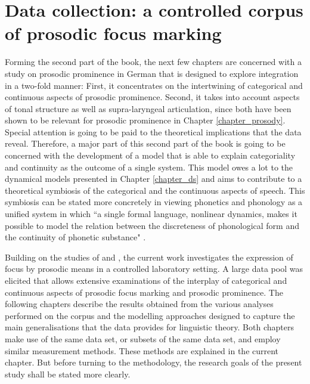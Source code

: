 \chapter{Data collection: a controlled corpus of prosodic focus marking}
\label{chapter_data}

Forming the second part of the book, the next few chapters are concerned with a study on prosodic prominence in German that is designed to explore integration in a two-fold manner: First, it concentrates on the intertwining of categorical and continuous aspects of prosodic prominence. Second, it takes into account aspects of tonal structure as well as supra-laryngeal articulation, since both have been shown to be relevant for prosodic prominence in Chapter \ref{chapter_prosody}. Special attention is going to be paid to the theoretical implications that the data reveal. Therefore, a major part of this second part of the book is going to be concerned with the development of a model that is able to explain categoriality and continuity as the outcome of a single system. This model owes a lot to the dynamical models presented in Chapter \ref{chapter_ds} and aims to contribute to a theoretical symbiosis of the categorical and the continuous aspects of speech. This symbiosis can be stated more concretely in viewing phonetics and phonology as a unified system in which ``a single formal language, nonlinear dynamics, makes it possible to model the relation between the discreteness of phonological form and the continuity of phonetic substance" \citep[937]{GafosBenus2006}. 

Building on the studies of \citet{MückeGrice2014} and \citet{Griceetal2017}, the current work investigates the expression of focus by prosodic means in a controlled laboratory setting. A large data pool was elicited that allows extensive examinations of the interplay of categorical and continuous aspects of prosodic focus marking and prosodic prominence. The following chapters describe the results obtained from the various analyses performed on the corpus and the modelling approaches designed to capture the main generalisations that the data provides for linguistic theory. Both chapters make use of the same data set, or subsets of the same data set, and employ similar measurement methods. These methods are explained in the current chapter. But before turning to the methodology, the research goals of the present study shall be stated more clearly. 

